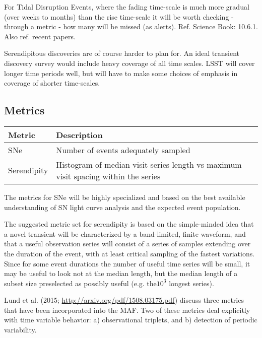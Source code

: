 For Tidal Disruption Events, where the fading time-scale is much more gradual (over weeks to months) than the rise time-scale it will be worth checking - through a metric - how many will be missed (as alerts). Ref. Science Book: 10.6.1. Also ref. recent papers.

Serendipitous discoveries are of course harder to plan for.  An ideal transient discovery survey would include heavy coverage of all time scales. LSST will cover longer time periods well, but will have to make some choices of emphasis in coverage of shorter time-scales.



\subsection{Metrics}
\label{sec:\secname:metrics}

\begin{center}
\begin{tabular}{| p{5cm} |p{10cm} |}
\hline Metric & Description\\
\hline
SNe & Number of events adequately sampled\\
Serendipity & Histogram of median visit series length vs maximum visit spacing within the series\\
  \hline \end{tabular}
 \end{center}

The metrics for SNe will be highly specialized and based on the best available understanding of SN light curve analysis and the expected event population.

The suggested metric set for serendipity is based on the simple-minded idea that a novel transient will be characterized by a band-limited, finite waveform, and that a useful observation series will consist of a series of samples extending over the duration of the event, with at least critical sampling of the fastest variations.  Since for some event durations the number of useful time series will be small, it may be useful to look not at the median length, but the median length of a subset size preselected as possibly useful (e.g. the$10^3$ longest series).

Lund et al. (2015; \url{http://arxiv.org/pdf/1508.03175.pdf}) discuss three metrics that have been incorporated into the MAF. Two of these metrics deal explicitly with time variable behavior: a) observational triplets, and b) detection of periodic variability.

